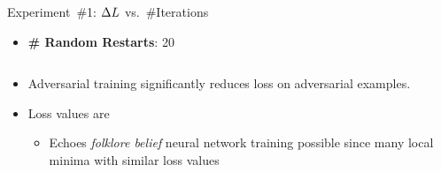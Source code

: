 \begin{frame}{Experiment~\#1: $\Delta L$ vs.\ \#Iterations}
  \begin{itemize}[<+->]
    \item \textbf{\# Random Restarts}: 20
  \end{itemize}

  \begin{columns}
    \begin{column}{0.23\textwidth}
      \begin{center}
      \end{center}
    \end{column}
    \begin{column}{0.2\textwidth}
      \begin{center}
      \end{center}
    \end{column}
    \begin{column}{0.21\textwidth}
      \begin{center}
      \end{center}
    \end{column}
    \begin{column}{0.22\textwidth}
      \begin{center}
      \end{center}
    \end{column}
  \end{columns}
  \vfill
  \begin{itemize}[<+->]
    \item Adversarial training significantly reduces loss on adversarial examples.
    \item Loss values are \textbf{}
      \begin{itemize}
        \item Echoes \textit{folklore belief} neural network training possible since many local minima with similar loss values
      \end{itemize}
  \end{itemize}
\end{frame}


